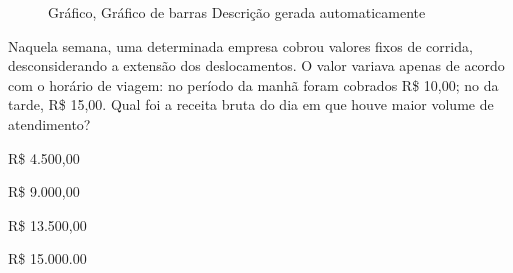 \begin{escolha}
\begin{boxmedio}
\begin{boxmedio}
{\begin{boxpeq}
\begin{boxpeq}
{\begin{boxpeq}
\begin{boxmedio}
\begin{boxmedio}
\begin{boxpeq}
\begin{boxmedio}
\begin{boxpeq}
\begin{boxpeq}
\begin{boxpeq}
\begin{boxpeq}
\begin{boxmedio}
{\begin{boxmedio}
\begin{boxmedio}
\begin{boxpeq}
\begin{boxmedio}
\begin{boxpeq}
\begin{boxpeq}
\begin{boxpeq}
\begin{escolha}
{\begin{boxmedio}
\begin{boxpeq}
\begin{boxpeq}
\begin{boxpeq}
\begin{boxpeq}
\begin{boxpeq}
\begin{boxmedio}
\begin{boxpeq}
\begin{boxpeq}
\begin{boxpeq}
{\begin{boxpeq}
\begin{boxmedio}
\begin{boxpeq}
\begin{boxpeq}
\begin{boxpeq}
{\begin{boxpeq}
\begin{boxmedio}
{\begin{boxpeq}
\begin{boxpeq}
\begin{boxmedio}
\begin{boxmedio}
\begin{boxpeq}
\begin{boxpeq}
{\begin{boxpeq}
\begin{boxpeq}
\begin{boxpeq}
\begin{boxpeq}
\begin{boxpeq}
\begin{escolha}
\begin{escolha}
{\begin{boxmedio}
\begin{boxpeq}
\begin{q°}
\begin{boxmedio}
\begin{boxpeq}
\begin{boxpeq}
\begin{boxmedio}
\begin{boxmedio}
\begin{boxmedio}
\begin{boxmedio}
{\begin{figure}
\caption{Gráfico, Gráfico de barras Descrição gerada automaticamente}
\end{figure}

Naquela semana, uma determinada empresa cobrou valores fixos de corrida,
desconsiderando a extensão dos deslocamentos. O valor variava apenas de 
acordo com o horário de viagem: no período da manhã foram cobrados 
R\$ 10,00; no da tarde, R\$ 15,00. Qual foi a receita bruta do dia 
em que houve maior volume de atendimento?

\begin{escolha}

  \item R\$ 4.500,00

  \item R\$ 9.000,00

  \item R\$ 13.500,00

  \item R\$ 15.000.00

\begin{escolha}

\end{escolha}
\end{escolha}}
\end{boxmedio}
\end{boxmedio}
\end{boxmedio}
\end{boxmedio}
\end{boxpeq}
\end{boxpeq}
\end{boxmedio}
\end{q°}
\end{boxpeq}
\end{boxmedio}}
\end{escolha}
\end{escolha}
\end{boxpeq}
\end{boxpeq}
\end{boxpeq}
\end{boxpeq}
\end{boxpeq}}
\end{boxpeq}
\end{boxpeq}
\end{boxmedio}
\end{boxmedio}
\end{boxpeq}
\end{boxpeq}}
\end{boxmedio}
\end{boxpeq}}
\end{boxpeq}
\end{boxpeq}
\end{boxpeq}
\end{boxmedio}
\end{boxpeq}}
\end{boxpeq}
\end{boxpeq}
\end{boxpeq}
\end{boxmedio}
\end{boxpeq}
\end{boxpeq}
\end{boxpeq}
\end{boxpeq}
\end{boxpeq}
\end{boxmedio}}
\end{escolha}
\end{boxpeq}
\end{boxpeq}
\end{boxpeq}
\end{boxmedio}
\end{boxpeq}
\end{boxmedio}
\end{boxmedio}}
\end{boxmedio}
\end{boxpeq}
\end{boxpeq}
\end{boxpeq}
\end{boxpeq}
\end{boxmedio}
\end{boxpeq}
\end{boxmedio}
\end{boxmedio}
\end{boxpeq}}
\end{boxpeq}
\end{boxpeq}}
\end{boxmedio}
\end{boxmedio}
\end{escolha}
